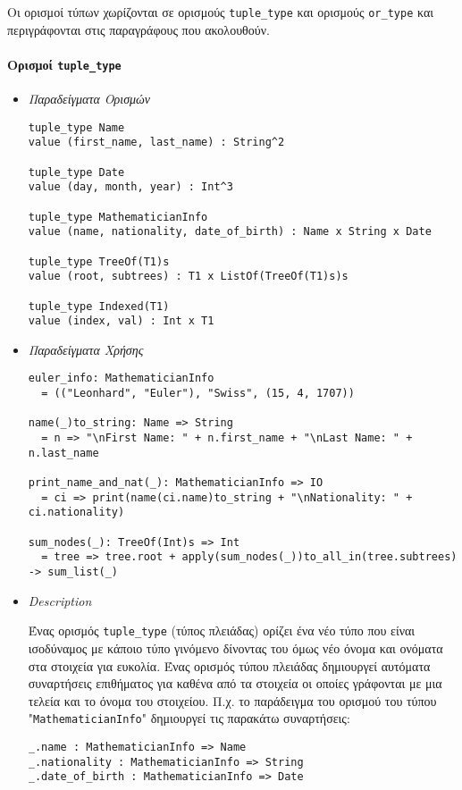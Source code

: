 \documentclass[diploma]{softlab-thesis}
\begin{document}
Οι ορισμοί τύπων χωρίζονται σε ορισμούς \verb|tuple_type| και ορισμούς
\verb|or_type| και περιγράφονται στις παραγράφους που ακολουθούν.

\paragraph{Ορισμοί \texttt{tuple_type}}

\begin{itemize}
\item \textit{Παραδείγματα Ορισμών}

\begin{verbatim}
tuple_type Name
value (first_name, last_name) : String^2

tuple_type Date
value (day, month, year) : Int^3

tuple_type MathematicianInfo
value (name, nationality, date_of_birth) : Name x String x Date

tuple_type TreeOf(T1)s
value (root, subtrees) : T1 x ListOf(TreeOf(T1)s)s

tuple_type Indexed(T1)
value (index, val) : Int x T1
\end{verbatim}

\item \textit{Παραδείγματα Χρήσης}

\begin{verbatim}
euler_info: MathematicianInfo
  = (("Leonhard", "Euler"), "Swiss", (15, 4, 1707))

name(_)to_string: Name => String
  = n => "\nFirst Name: " + n.first_name + "\nLast Name: " + n.last_name

print_name_and_nat(_): MathematicianInfo => IO
  = ci => print(name(ci.name)to_string + "\nNationality: " + ci.nationality)

sum_nodes(_): TreeOf(Int)s => Int
  = tree => tree.root + apply(sum_nodes(_))to_all_in(tree.subtrees) -> sum_list(_)
\end{verbatim}

\item \textit{Description}

Ένας ορισμός \verb|tuple_type| (τύπος πλειάδας) ορίζει ένα νέο τύπο που είναι
ισοδύναμος με κάποιο τύπο γινόμενο δίνοντας του όμως νέο όνομα και ονόματα στα
στοιχεία για ευκολία. Ένας ορισμός τύπου πλειάδας δημιουργεί αυτόματα
συναρτήσεις επιθήματος για καθένα από τα στοιχεία οι οποίες γράφονται με μια
τελεία και το όνομα του στοιχείου. Π.χ. το παράδειγμα του ορισμού του τύπου
"\verb|MathematicianInfo|" δημιουργεί τις παρακάτω συναρτήσεις:
\begin{verbatim}
_.name : MathematicianInfo => Name
_.nationality : MathematicianInfo => String
_.date_of_birth : MathematicianInfo => Date
\end{verbatim}

\end{itemize}
\end{document}
